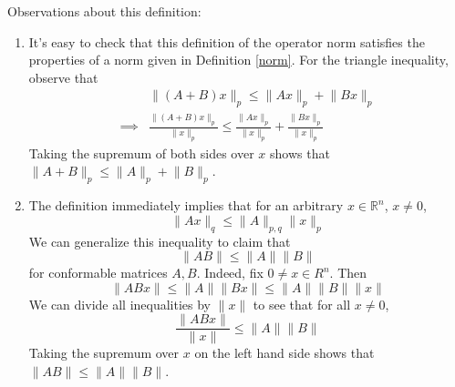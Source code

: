 \documentclass[12pt]{article}
\theoremstyle{definition}
\newcommand{\norm}[1]{\lVert#1\rVert}
\begin{document}
Observations about this definition:
\begin{enumerate}
	\item It's easy to check that this definition of the operator norm satisfies the properties of a norm given in Definition \ref{norm}. For the triangle inequality, observe that
	\begin{align*}
		&\norm{(A + B)x}_p \leq \norm{Ax}_p + \norm{Bx}_p \tag{from Minkowski's inequality} \\
		\implies & \frac{\norm{(A + B)x}_p}{\norm{x}_p} \leq \frac{\norm{Ax}_p}{\norm{x}_p} + \frac{\norm{Bx}_p}{\norm{x}_p}
	\end{align*}
	Taking the supremum of both sides over $x$ shows that $\norm{A + B}_p \leq \norm{A}_p + \norm{B}_p$.
	\item The definition immediately implies that for an arbitrary $x \in \mathbb{R}^n$, $x \neq 0$, 
	\begin{equation}
		\norm{Ax}_q \leq \norm{A}_{p,q} \norm{x}_p
	\end{equation}
	We can generalize this inequality to claim that
	\begin{equation}
		\norm{AB} \leq \norm{A} \norm{B}
	\end{equation}
	for conformable matrices $A, B$. Indeed, fix $0 \neq x \in R^n$. Then
	\begin{equation}
		\norm{ABx} \leq \norm{A} \norm{Bx} \leq \norm{A}\norm{B}\norm{x}
	\end{equation}
	We can divide all inequalities by $\norm{x}$ to see that for all $x \neq 0$,
	\begin{equation}
		\frac{\norm{ABx}}{\norm{x}} \leq \norm{A}\norm{B}
	\end{equation}
	Taking the supremum over $x$ on the left hand side shows that $\norm{AB} \leq \norm{A} \norm{B}$.
\end{enumerate}
\end{document}
